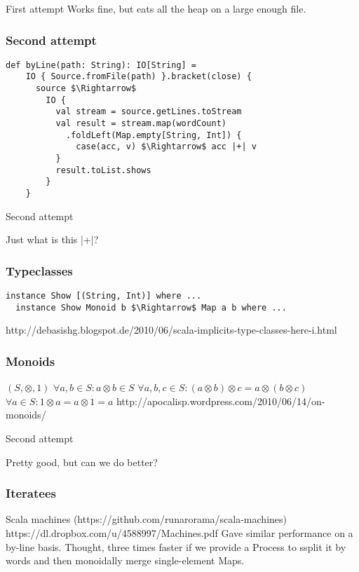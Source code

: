 \documentclass{beamer}
\begin{document}
\begin{frame}{First attempt}
  Works fine, but eats all the heap on a large enough file.
\end{frame}

\begin{frame}[fragile]
\frametitle{Second attempt}
\begin{lstlisting}[mathescape]
  def byLine(path: String): IO[String] =
    IO { Source.fromFile(path) }.bracket(close) {
      source $\Rightarrow$
        IO {
          val stream = source.getLines.toStream
          val result = stream.map(wordCount)
            .foldLeft(Map.empty[String, Int]) {
              case(acc, v) $\Rightarrow$ acc |+| v
          }
          result.toList.shows
        }
    }
\end{lstlisting}
\end{frame}

\begin{frame}{Second attempt}
  \Large \centerline{Just what is this |+|?}
\end{frame}

\begin{frame}[fragile]
\frametitle{Typeclasses}
\begin{lstlisting}[mathescape]
  instance Show [(String, Int)] where ...
  instance Show Monoid b $\Rightarrow$ Map a b where ...
\end{lstlisting}
http://debasishg.blogspot.de/2010/06/scala-implicits-type-classes-here-i.html
\end{frame}

\begin{frame}[fragile]
\frametitle{Monoids}
\begin{center}
$(S, \otimes, 1)$\newline
$\forall a, b \in S: a \otimes b \in S$\newline
$\forall a, b, c \in S: (a \otimes b) \otimes c = a \otimes (b \otimes c)$\newline
$\forall a \in S: 1 \otimes a = a \otimes 1 = a$\newline
http://apocalisp.wordpress.com/2010/06/14/on-monoids/
\end{center}
\end{frame}

\begin{frame}{Second attempt}
  \Large \centerline{Pretty good, but can we do better?}
\end{frame}

\begin{frame}[fragile]
\frametitle{Iteratees}
\Large Scala machines (https://github.com/runarorama/scala-machines) \normalsize
https://dl.dropbox.com/u/4588997/Machines.pdf\newline
Gave similar performance on a by-line basis.\newline
Thought, three times faster if we provide a Process to ssplit it by
words and then monoidally merge single-element Maps.
\end{frame}
\end{document}

